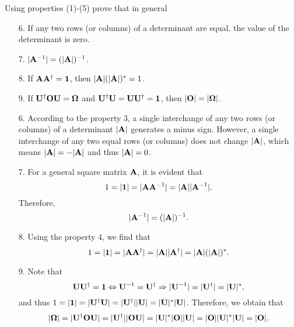 \documentclass[a4paper]{book}
\newcounter{exercise}[chapter]
\newcounter{solution}[chapter]
\newcommand{\A}{{\bf A}}
\newcommand{\I}{{\bf 1}}
\newcommand{\U}{{\bf U}}
\newcommand{\Op}{{\bf O}}
\begin{document}
	\begin{exercise}
	Using properties (1)-(5) prove that in general
	\begin{itemize}
	
	\item[6.] If any two rows (or columns) of a determinant are equal, the value of the determinant is zero.
	
	\item[7.] $|\A^{-1}| = (|\A|)^{-1}$.
	
	\item[8.] If $\A\A^\dagger=\I$, then $|\A|(|\A|)^*=1$.
	
	\item[9.] If $\U^\dagger\Op\U = {\bf \Omega}$ and $\U^\dagger\U=\U\U^\dagger=\I$, then $|\Op|=|{\bf \Omega}|$.	
	
	\end{itemize}
	\end{exercise}
	
	\begin{solution}
	
	\begin{itemize}
	
	\item[6.] According to the property 3, a single interchange of any two rows (or columns) of a determinant $|\A|$ generates a minus sign. However, a single interchange of any two equal rows (or columns) does not change $|\A|$, which means $|\A| = -|\A|$ and thus $|\A| = 0$.
	
	\item[7.] For a general square matrix $\A$, it is evident that
	\[
		1 = |\I| = |\A \A^{-1}| = |\A| |\A^{-1}| .
	\] 
	Therefore,
	\[
		| \A^{-1} | = ( |\A| )^{-1} .
	\]
	
	\item[8.] Using the property 4, we find that
	\[
		1 = |\I| = | \A \A^\dagger | = | \A | | \A^\dagger | = | \A | (| \A |)^* .
	\]
	
	\item[9.] Note that	
	\[
		\U \U^\dagger = \I \Leftrightarrow \U^{-1} = \U^\dagger \Rightarrow | \U^{-1} | = | \U^\dagger | = | \U |^* ,
	\]	
	and thus $1 = | \I | = | \U^\dagger \U | = | \U^\dagger | | \U | = | \U |^* | \U |$. Therefore, we obtain that
	\[
		| {\bf \Omega} | = | \U^\dagger \Op \U | = | \U^\dagger | | \Op \U | = | \U |^* | \Op | | \U | = | \Op | | \U |^* | \U | = | \Op | .
	\]
	
	\end{itemize}		
	
	\end{solution}
	
\end{document}
